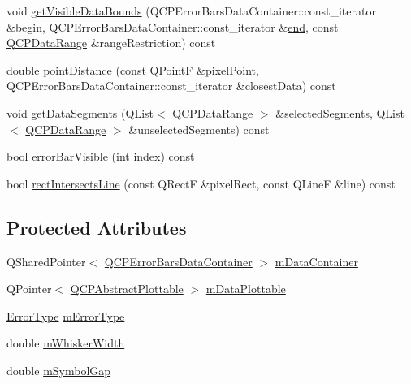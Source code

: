 \begin{DoxyCompactItemize}
void \mbox{\hyperlink{class_q_c_p_error_bars_aac9ffa98815035d300b2e9a67495ba4c}{get\+Visible\+Data\+Bounds}} (Q\+C\+P\+Error\+Bars\+Data\+Container\+::const\+\_\+iterator \&begin, Q\+C\+P\+Error\+Bars\+Data\+Container\+::const\+\_\+iterator \&\mbox{\hyperlink{myutils_8h_a64d77caddefed4b96fa62e3f5f73c9a2}{end}}, const \mbox{\hyperlink{class_q_c_p_data_range}{Q\+C\+P\+Data\+Range}} \&range\+Restriction) const
\item 
double \mbox{\hyperlink{class_q_c_p_error_bars_a8e904076bad643f43af28b95f21c1b88}{point\+Distance}} (const Q\+PointF \&pixel\+Point, Q\+C\+P\+Error\+Bars\+Data\+Container\+::const\+\_\+iterator \&closest\+Data) const
\item 
void \mbox{\hyperlink{class_q_c_p_error_bars_a243e0bb2563fc2e9f08efd77e7175abf}{get\+Data\+Segments}} (Q\+List$<$ \mbox{\hyperlink{class_q_c_p_data_range}{Q\+C\+P\+Data\+Range}} $>$ \&selected\+Segments, Q\+List$<$ \mbox{\hyperlink{class_q_c_p_data_range}{Q\+C\+P\+Data\+Range}} $>$ \&unselected\+Segments) const
\item 
bool \mbox{\hyperlink{class_q_c_p_error_bars_a5ad9abccb1be3df25485ad7dc21b3b89}{error\+Bar\+Visible}} (int index) const
\item 
bool \mbox{\hyperlink{class_q_c_p_error_bars_aa9b1642567a0aff8a2f6e0556c563633}{rect\+Intersects\+Line}} (const Q\+RectF \&pixel\+Rect, const Q\+LineF \&line) const
\end{DoxyCompactItemize}
\subsection*{Protected Attributes}
\begin{DoxyCompactItemize}
\item 
Q\+Shared\+Pointer$<$ \mbox{\hyperlink{qcustomplot_8h_a8c4472a4da738e0ddbf6b03222c39906}{Q\+C\+P\+Error\+Bars\+Data\+Container}} $>$ \mbox{\hyperlink{class_q_c_p_error_bars_a83c7f452d0eebd302a7e4fb3a1957634}{m\+Data\+Container}}
\item 
Q\+Pointer$<$ \mbox{\hyperlink{class_q_c_p_abstract_plottable}{Q\+C\+P\+Abstract\+Plottable}} $>$ \mbox{\hyperlink{class_q_c_p_error_bars_a14b6a5b49295990da84a05a3a89026bb}{m\+Data\+Plottable}}
\item 
\mbox{\hyperlink{class_q_c_p_error_bars_a95f0220f11a72648b96480a85ce26474}{Error\+Type}} \mbox{\hyperlink{class_q_c_p_error_bars_af9fd3117b86aac728c9e8e87c406ed9a}{m\+Error\+Type}}
\item 
double \mbox{\hyperlink{class_q_c_p_error_bars_a3873724f7ac3392bdf9d46a47076a1d2}{m\+Whisker\+Width}}
\item 
double \mbox{\hyperlink{class_q_c_p_error_bars_a5cb5628b75e5aff0875710705666ec57}{m\+Symbol\+Gap}}
\end{DoxyCompactItemize}
